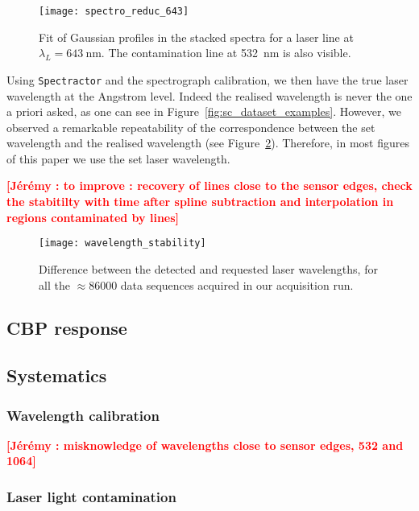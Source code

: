 \documentclass[onecolumn]{aa}
\newcommand{\todo}[1]{\textbf{\textcolor{red}{[#1]}}\xspace}
\begin{document}
\begin{figure}[!h]
\centering
\texttt{[image: spectro\_reduc\_643]}
\caption{Fit of Gaussian profiles in the stacked spectra for a laser line at $\lambda_L=\SI{643}{\nm}$. The contamination line at \SI{532}{nm} is also visible.}\label{fig:spectro_reduc_643}
\end{figure}


Using \texttt{Spectractor} and the spectrograph calibration, we then have the true laser wavelength at the Angstrom level. Indeed the realised wavelength is never the one a priori asked, as one can see in Figure~\ref{fig:sc_dataset_examples}. However, we observed a remarkable repeatability of the correspondence between the set wavelength and the realised wavelength (see Figure~\ref{fig:wavelength_stability}). Therefore, in most figures of this paper we use the set laser wavelength. 

\todo{Jérémy : to improve : recovery of lines close to the sensor edges, check the stabitilty with time after spline subtraction and interpolation in regions contaminated by lines}




\begin{figure}[!h]
\centering
\texttt{[image: wavelength\_stability]}
\caption{Difference between the detected and requested laser wavelengths, for all the $\approx 86000$ data sequences acquired in our acquisition run.}\label{fig:wavelength_stability}
\end{figure}

\subsection{CBP response}

\subsection{Systematics}

\subsubsection{Wavelength calibration}

\todo{Jérémy : misknowledge of wavelengths close to sensor edges, 532 and 1064}


\subsubsection{Laser light contamination}
\end{document}
